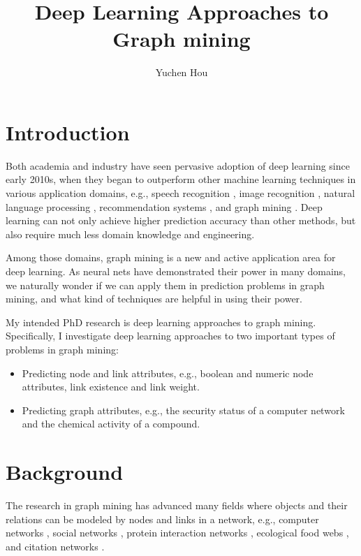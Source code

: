 \documentclass{article}
\begin{document}
	\title{Deep Learning Approaches to Graph mining}
	\author{Yuchen Hou}
	\maketitle

\section{Introduction}
Both academia and industry have seen pervasive adoption of deep learning since early 2010s,
when they began to outperform other machine learning techniques in various 
application domains, e.g.,
speech recognition \cite{hannun2014deep},
image recognition \cite{simonyan2014very},
natural language processing \cite{yao2013recurrent},
recommendation systems \cite{barkan2016item2vec},
and graph mining \cite{grovernode2vec}.
Deep learning can not only achieve higher prediction accuracy than other methods,
but also require much less domain knowledge and engineering.

Among those domains,
graph mining is a new and active application area for deep learning.
As neural nets have demonstrated their power in many domains,
we naturally wonder if we can apply them in prediction problems in graph mining,
and what kind of techniques are helpful in using their power.

My intended PhD research is deep learning approaches to graph mining.
Specifically, I investigate deep learning approaches to
two important types of problems in graph mining:
\begin{itemize}
	\item Predicting node and link attributes, e.g., boolean and numeric node attributes, link existence and link weight.
	\item Predicting graph attributes, e.g., the security status of a computer network and the chemical activity of a compound.
\end{itemize}

\section{Background}
The research in graph mining has advanced many fields
where objects and their relations can be modeled by nodes and links in a network, e.g.,
computer networks \cite{bermond1995distributed},
social networks \cite{cook2006mining},
protein interaction networks \cite{bader2003automated},
ecological food webs \cite{brown2003ecological},
and citation networks \cite{greenberg2009citation}.
\end{document}
